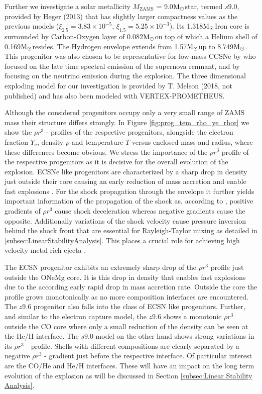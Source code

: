 \documentclass[fleqn,usenatbib]{mnras}
\newcommand{\solm}{\xspace\ensuremath{\rm{M_{\odot}}}}
\newcommand{\vertexprom}{\textsc{V{\footnotesize ERTEX}-P{\footnotesize ROMETHEUS}}\xspace}
\begin{document}
Further we investigate a solar metallicity $M_{\mathrm{ZAMS}}$ = 9.0\solm star, termed $s9.0$, provided by Heger (2013) that has slightly larger compactness values as the previous models ($\xi_{2.5}= 3.83 \times 10^{-5}$, $\xi_{1.5}= 5.25 \times 10^{-3}$). Its 1.318\solm Iron core is surrounded by Carbon-Oxygen layer of 0.082\solm on top of which a Helium shell of 0.169\solm resides. The Hydrogen envelope extends from 1.57\solm up to 8.749\solm. 
This progenitor was also chosen to be representative for low-mass CCSNe by \cite{Jerkstrand2017a} who focused on the late time spectral emission of the supernova remnant, and by \cite{Glas2018} focusing on the neutrino emission during the explosion. The three dimensional exploding model for our investigation is provided by T. Melson (2018, not published) and has also been modeled with \vertexprom.

Although the considered progenitors occupy only a very small range of ZAMS mass their structure differs strongly. In Figure \ref{fig:prog_tem_rho_ye_rhor} we show the $\rho r^3$ - profiles of the respective progenitors, alongside the electron fraction $Y_{\mathrm{e}}$, density $\rho$ and temperature $T$ versus enclosed mass and radius, where these differences become obvious. We stress the importance of the $\rho r^3$ profile of the respective progenitors as it is decisive for the overall evolution of the explosion. ECSNe like progenitors are characterized by a sharp drop in density just outside their core causing an early reduction of mass accretion and enable fast explosions \cite{Mueller2019}.
For the shock propagation through the envelope it further yields important information of the propagation of the shock as, according to \cite{Sedov1961}, positive gradients of $\rho r^3$ cause shock deceleration whereas negative gradients cause the opposite. Additionally variations of the shock velocity cause pressure inversion behind the shock front that are essential for Rayleigh-Taylor mixing as detailed in \ref{subsec:LinearStabilityAnalysis}. This places a crucial role for achieving high velocity metal rich ejecta \cite{Wongwathanarat2015}.

The ECSN progenitor exhibits an extremely sharp drop of the $\rho r^3$ profile just outside the ONeMg core. It is this drop in density that enables fast explosions due to the according early rapid drop in mass accretion rate. Outside the core the profile grows monotonically as no more composition interfaces are encountered.
The $z9.6$ progenitor also falls into the class of ECSN like progenitors. Further, and similar to the electron capture model, the $z9.6$ shows a monotonic $\rho r^3$ outside the CO core where only a small reduction of the density can be seen at the He/H interface.
The $s9.0$ model on the other hand shows strong variations in its $\rho r^3$ - profile. Shells with different compositions are clearly separated by a negative $\rho r^3$ - gradient just before the respective interface. Of particular interest are the CO/He and He/H interfaces. These will have an impact on the long term evolution of the explosion as will be discussed in Section \ref{subsec:Linear Stability Analysis}.
\end{document}
